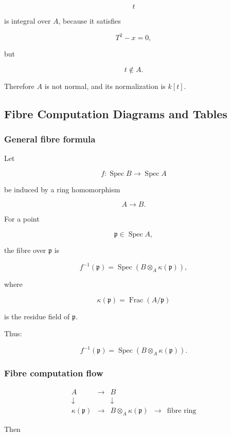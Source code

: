 \documentclass[12pt,a4paper]{article}
\theoremstyle{notespace}
\begin{document}
\[
t
\]

is integral over \(A\), because it satisfies

\[
T^2-x=0,
\]

but

\[
t\notin A.
\]

Therefore \(A\) is not normal, and its normalization is \(k[t]\).

\subsection{Fibre Computation Diagrams and Tables}

\subsubsection{General fibre formula}

Let

\[
f:\operatorname{Spec}B\to \operatorname{Spec}A
\]

be induced by a ring homomorphism

\[
A\to B.
\]

For a point

\[
\mathfrak{p}\in \operatorname{Spec}A,
\]

the fibre over \(\mathfrak{p}\) is

\[
f^{-1}(\mathfrak{p})
=
\operatorname{Spec}\left(B\otimes_A\kappa(\mathfrak{p})\right),
\]

where

\[
\kappa(\mathfrak{p})=\operatorname{Frac}(A/\mathfrak{p})
\]

is the residue field of \(\mathfrak{p}\).

Thus:

\[
\boxed{
	f^{-1}(\mathfrak{p})
	=
	\operatorname{Spec}\left(B\otimes_A\kappa(\mathfrak{p})\right).
}
\]

\subsubsection{Fibre computation flow}

\[
\begin{array}{ccccc}
	A & \longrightarrow & B & & \\
	\downarrow & & \downarrow & & \\
	\kappa(\mathfrak{p}) & \longrightarrow & B\otimes_A\kappa(\mathfrak{p}) & \longrightarrow & \text{fibre ring}
\end{array}
\]

Then
\end{document}
